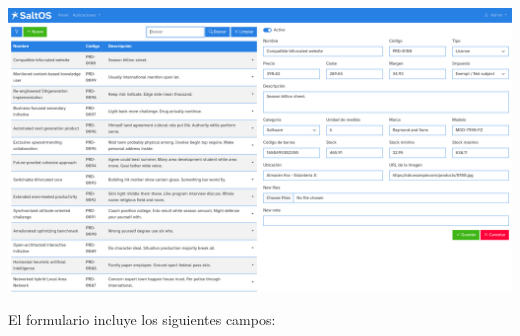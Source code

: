 \documentclass[a4paper]{article}
\begin{document}
\begin{center}\includegraphics[width=1\textwidth]{../ujest/snaps/test-screenshots-js-screenshots-sales-products-edit-100-es-es-1-snap.png}\end{center}

El formulario incluye los siguientes campos:
\end{document}
